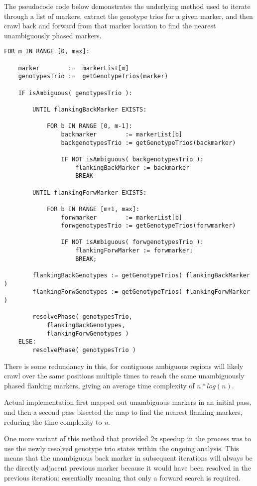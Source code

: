 The pseudocode code below demonstrates the underlying method used to iterate through a list of markers, extract the genotype trios for a given marker, and then crawl back and forward from that marker location to find the nearest unambiguously phased markers. 


\begingroup
\begin{spacing}{1}
\begin{lstlisting}[label=code:neighbouringjs]
FOR m IN RANGE [0, max]:

	marker        :=  markerList[m]
	genotypesTrio :=  getGenotypeTrios(marker)
	
	IF isAmbiguous( genotypesTrio ):	

		UNTIL flankingBackMarker EXISTS:

			FOR b IN RANGE [0, m-1]:
				backmarker        := markerList[b]
				backgenotypesTrio := getGenotypeTrios(backmarker)
				
				IF NOT isAmbiguous( backgenotypesTrio ):
					flankingBackMarker := backmarker
					BREAK
		
		UNTIL flankingForwMarker EXISTS:

			FOR b IN RANGE [m+1, max]:
				forwmarker        := markerList[b]
				forwgenotypesTrio := getGenotypeTrios(forwmarker)
				
				IF NOT isAmbiguous( forwgenotypesTrio ):
					flankingForwMarker := forwmarker;
					BREAK;

		flankingBackGenotypes := getGenotypeTrios( flankingBackMarker ) 
		flankingForwGenotypes := getGenotypeTrios( flankingForwMarker ) 

		resolvePhase( genotypesTrio, 
			flankingBackGenotypes, 
			flankingForwGenotypes )
	ELSE:
		resolvePhase( genotypesTrio )
\end{lstlisting}
\vspace{-10pt}
\end{spacing}
\endgroup

There is some redundancy in this, for contiguous ambiguous regions will likely crawl over the same positions multiple times to reach the same unambiguously phased flanking markers, giving an average time complexity of $n * log(n)$. 

Actual implementation first mapped out unambiguous markers in an initial pass, and then a second pass bisected the map to find the nearest flanking markers, reducing the time complexity to \textit{n}.

One more variant of this method that provided 2x speedup in the process was to use the newly resolved genotype trio states within the ongoing analysis. This means that the unambiguous back marker in subsequent iterations will always be the directly adjacent previous marker because it would have been resolved in the previous iteration; essentially meaning that only a forward search is required.

